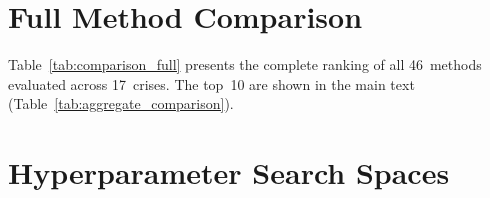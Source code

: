 \documentclass[3p]{elsarticle}
\begin{document}
\section{Full Method Comparison}\label{sec:full_comparison}

Table~\ref{tab:comparison_full} presents the complete ranking of all
46~methods evaluated across 17~crises.  The top~10 are shown in
the main text (Table~\ref{tab:aggregate_comparison}).

\begin{table}[htbp]
\centering
\caption{Full 46-method comparison across 17 crises.  Median Cohen's $d$,
  mean Friedman rank (over all 46~methods), and category.
  See Table~\ref{tab:aggregate_comparison} for the top~10.}
\label{tab:comparison_full}

\end{table}

\section{Hyperparameter Search Spaces}\label{sec:hpo_search}
\end{document}
